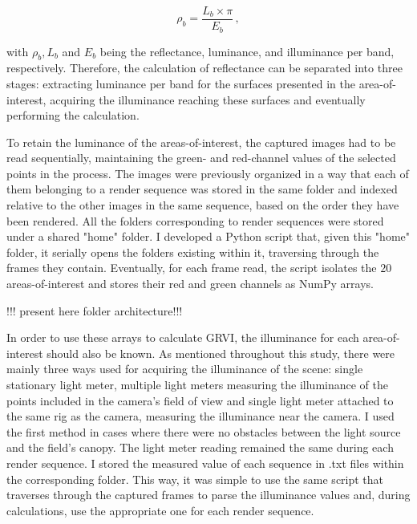 \begin{equation}
    \rho_b = \frac{L_b \times \pi}{E_b}\,,
    \label{lambertian1}
\end{equation}

with $\rho_b, L_b$ and $E_b$ being the reflectance, luminance, and illuminance per band, respectively. Therefore, the calculation of reflectance can be separated into three stages: extracting luminance per band for the surfaces presented in the area-of-interest, acquiring the illuminance reaching these surfaces and eventually performing the calculation. 

To retain the luminance of the areas-of-interest, the captured images had to be read sequentially, maintaining the green- and red-channel values of the selected points in the process. The images were previously organized in a way that each of them belonging to a render sequence was stored in the same folder and indexed relative to the other images in the same sequence, based on the order they have been rendered. All the folders corresponding to render sequences were stored under a shared "home" folder. I developed a Python script that, given this "home" folder, it serially opens the folders existing within it, traversing through the frames they contain. Eventually, for each frame read, the script isolates the $20$ areas-of-interest and stores their red and green channels as NumPy arrays.

!!! present here folder architecture!!!

In order to use these arrays to calculate GRVI, the illuminance for each area-of-interest should also be known. As mentioned throughout this study, there were mainly three ways used for acquiring the illuminance of the scene: single stationary light meter, multiple light meters measuring the illuminance of the points included in the camera's field of view and single light meter attached to the same rig as the camera, measuring the illuminance near the camera. I used the first method in cases where there were no obstacles between the light source and the field's canopy. The light meter reading remained the same during each render sequence. I stored the measured value of each sequence in .txt files within the corresponding folder. This way, it was simple to use the same script that traverses through the captured frames to parse the illuminance values and, during calculations, use the appropriate one for each render sequence.

